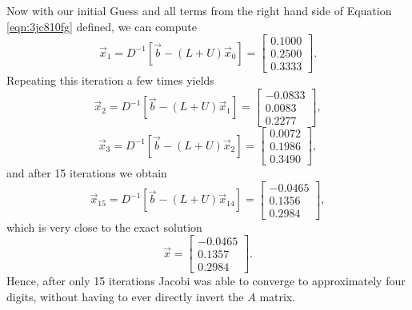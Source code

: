Now with our initial Guess and all terms from the right hand side of Equation \ref{eqn:3jc810fg} defined, we can compute
\begin{equation}
	\vec{x}_{1} = D^{-1}\left[ \vec{b} - (L+U)\vec{x}_0 \right] = \begin{bmatrix}
	    0.1000 \\
	    0.2500 \\
			0.3333
	\end{bmatrix}.
\end{equation}
Repeating this iteration a few times yields
\begin{equation}
	\vec{x}_{2} = D^{-1}\left[ \vec{b} - (L+U)\vec{x}_1 \right] = \begin{bmatrix}
	    -0.0833 \\
	    0.0083 \\
			0.2277
	\end{bmatrix},
\end{equation}
\begin{equation}
	\vec{x}_{3} = D^{-1}\left[ \vec{b} - (L+U)\vec{x}_2 \right] = \begin{bmatrix}
	    0.0072 \\
	    0.1986 \\
			0.3490
	\end{bmatrix},
\end{equation}
and after 15 iterations we obtain
\begin{equation}
	\vec{x}_{15} = D^{-1}\left[ \vec{b} - (L+U)\vec{x}_14 \right] = \begin{bmatrix}
	    -0.0465 \\
	    0.1356 \\
			0.2984
	\end{bmatrix},
\end{equation}
which is very close to the exact solution
\begin{equation}
	\vec{x} = \begin{bmatrix}
	    -0.0465 \\
	    0.1357 \\
			0.2984
	\end{bmatrix}.
\end{equation}
Hence, after only 15 iterations Jacobi was able to converge to approximately four digits, without having to ever directly invert the $A$ matrix.

